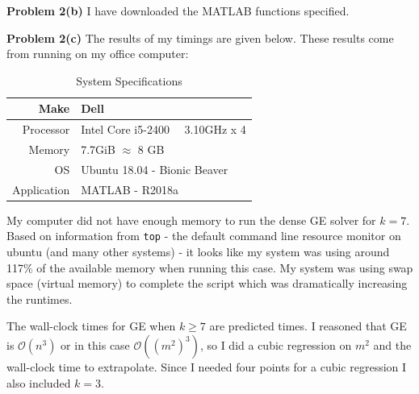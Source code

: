 \documentclass[12pt]{article}
\newcommand{\problem}[1]{\hspace{-4 ex} \large \textbf{Problem #1} }
\begin{document}
\bigbreak
\problem{2(b)} I have downloaded the MATLAB functions specified.

\bigbreak
\problem{2(c)} The results of my timings are given below. These results come from running on my office computer:
\begin{table}[H]
	\caption{System Specifications}
	\begin{center}
		\begin{tabular}{|r|l|}
			\hline
			Make & Dell\\ \hline
			Processor & Intel Core i5-2400 \ \  3.10GHz x 4\\ \hline
			Memory & 7.7GiB $\approx$ 8 GB\\ \hline
			OS & Ubuntu 18.04 - Bionic Beaver\\ \hline
			Application & MATLAB - R2018a \\ \hline
		\end{tabular}
	\end{center}
\end{table}

My computer did not have enough memory to run the dense GE solver for $k=7$. Based on information from \texttt{top} - the default command line resource monitor on ubuntu (and many other systems) - it looks like my system was using around 117\% of the available memory when running this case. My system was using swap space (virtual memory) to complete the script which was dramatically increasing the runtimes. \bigbreak

The wall-clock times for GE when $k \geq 7$ are predicted times. I reasoned that GE is $\mathcal{O}(n^3)$ or in this case $\mathcal{O}((m^2)^3)$, so I did a cubic regression on $m^2$ and the wall-clock time to extrapolate. Since I needed four points for a cubic regression I also included $k=3$.
\end{document}
